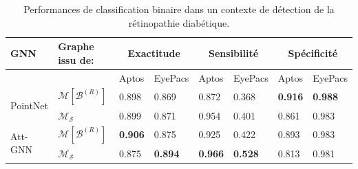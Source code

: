\begin{table}
	\caption{Performances de classification binaire dans un contexte de détection de la rétinopathie diabétique.}
	\label{tab:DetectionRDScoreGraph}
	\centering
	\begin{tabular}{ll|ll|ll|ll}
		\toprule
		GNN & Graphe issu de: & \multicolumn{2}{c}{Exactitude} & \multicolumn{2}{c}{Sensibilité} & \multicolumn{2}{c}{Spécificité} \\
		\midrule
		&& Aptos & EyePacs& Aptos & EyePacs& Aptos & EyePacs \\
		\midrule
		\multirow{2}{2cm}{PointNet} & $\mathcal{M}[\mathcal{B}^{(R)}]$ & 0.898 & 0.869 & 0.872 & 0.368 & \textbf{0.916} & \textbf{0.988} \\ 
		& $\mathcal{M}_\mathcal{S}$& 0.899 & 0.871 & 0.954 & 0.401 & 0.861 & 0.983 \\
		\midrule 
		\multirow{2}{2cm}{Att-GNN} &$\mathcal{M}[\mathcal{B}^{(R)}]$& \textbf{0.906} & 0.875 & 0.925 & 0.422 & 0.893 & 0.983 \\ 
		&$\mathcal{M}_\mathcal{S}$& 0.875 & \textbf{0.894} & \textbf{0.966} & \textbf{0.528} & 0.813 & 0.981 \\
		\midrule
	\end{tabular}
\end{table}

